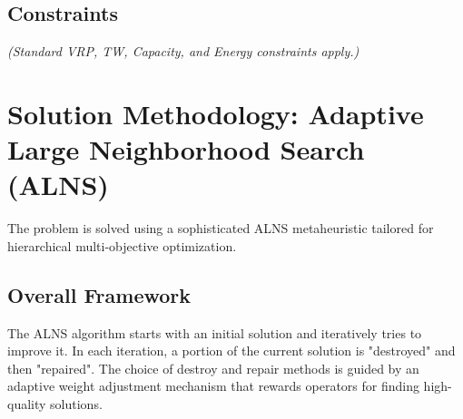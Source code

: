 \documentclass[a4paper,12pt]{article}
\begin{document}
\subsection{Constraints}
\textit{(Standard VRP, TW, Capacity, and Energy constraints apply.)}

\section{Solution Methodology: Adaptive Large Neighborhood Search (ALNS)}

The problem is solved using a sophisticated ALNS metaheuristic tailored for hierarchical multi-objective optimization.

\subsection{Overall Framework}

The ALNS algorithm starts with an initial solution and iteratively tries to improve it. In each iteration, a portion of the current solution is "destroyed" and then "repaired". The choice of destroy and repair methods is guided by an adaptive weight adjustment mechanism that rewards operators for finding high-quality solutions.
\end{document}
